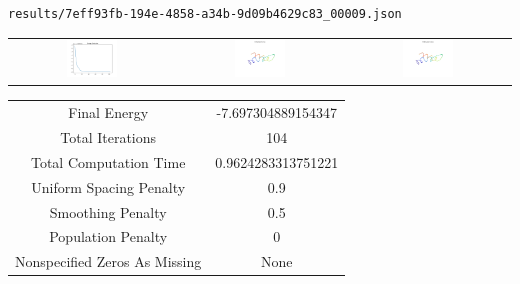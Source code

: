\documentclass{report}
\begin{document}
\begin{lstlisting}
results/7eff93fb-194e-4858-a34b-9d09b4629c83_00009.json
\end{lstlisting}
\begin{tabular}{ccc}
\includegraphics[width=0.32\textwidth]{7eff93fb-194e-4858-a34b-9d09b4629c83_00009_energies.png}
&
\includegraphics[width=0.32\textwidth]{7eff93fb-194e-4858-a34b-9d09b4629c83_00009_initial_curves.png}
&
\includegraphics[width=0.32\textwidth]{7eff93fb-194e-4858-a34b-9d09b4629c83_00009_estimated_curves.png}
\\
\end{tabular}
\begin{tabular}{cc}
Final Energy&-7.697304889154347\\
Total Iterations&104\\
Total Computation Time&0.9624283313751221\\
Uniform Spacing Penalty&0.9\\
Smoothing Penalty&0.5\\
Population Penalty&0\\
Nonspecified Zeros As Missing&None\\
\end{tabular}
\end{document}
